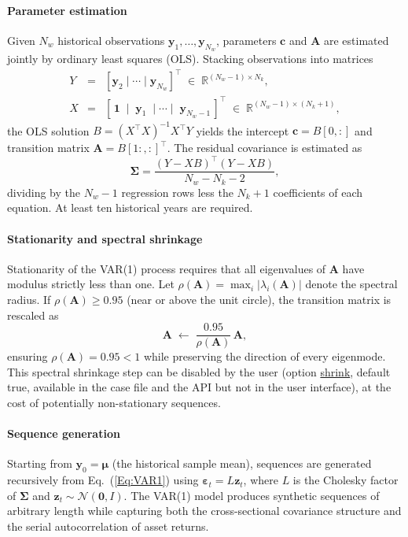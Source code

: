 \documentclass[fleqn,12pt]{report}
\newcommand{\code}[1]{\url{#1}}
\begin{document}
\paragraph*{Parameter estimation}
Given $N_w$ historical observations
$\bm{y}_1, \ldots, \bm{y}_{N_w}$,
parameters $\mathbf{c}$ and $\mathbf{A}$ are estimated jointly by ordinary
least squares (OLS).
Stacking observations into matrices
\begin{eqnarray}
    Y &=& [\bm{y}_2 \mid \cdots \mid \bm{y}_{N_w}]^\top
          \;\in\; \mathbb{R}^{(N_w-1)\times N_k}, \\
    X &=& [\,\mathbf{1} \;\mid\; \bm{y}_1 \;\mid \cdots \mid\; \bm{y}_{N_w-1}\,]^\top
          \;\in\; \mathbb{R}^{(N_w-1)\times (N_k+1)},
\end{eqnarray}
the OLS solution $B = (X^\top X)^{-1} X^\top Y$ yields the intercept
$\mathbf{c} = B[0,:]$ and transition matrix $\mathbf{A} = B[1:,:]^\top$.
The residual covariance is estimated as
\begin{equation}
    \bm{\Sigma} = \frac{(Y - XB)^\top(Y - XB)}{N_w - N_k - 2},
\end{equation}
dividing by the $N_w - 1$ regression rows less the $N_k + 1$ coefficients of each equation.
At least ten historical years are required.

\paragraph*{Stationarity and spectral shrinkage}
Stationarity of the VAR(1) process requires that all eigenvalues of
$\mathbf{A}$ have modulus strictly less than one.
Let $\rho(\mathbf{A}) = \max_i |\lambda_i(\mathbf{A})|$ denote the spectral
radius.
If $\rho(\mathbf{A}) \ge 0.95$ (near or above the unit circle), the
transition matrix is rescaled as
\begin{equation}
    \mathbf{A} \;\leftarrow\; \frac{0.95}{\rho(\mathbf{A})}\,\mathbf{A},
\end{equation}
ensuring $\rho(\mathbf{A}) = 0.95 < 1$ while preserving the direction of
every eigenmode.
This spectral shrinkage step can be disabled by the user (option \code{shrink}, default
true, available in the case file and the API but not in the user interface), at the cost
of potentially non-stationary sequences.

\paragraph*{Sequence generation}
Starting from $\bm{y}_0 = \bm{\mu}$ (the historical sample mean),
sequences are generated recursively from Eq.~(\ref{Eq:VAR1}) using
$\bm{\varepsilon}_t = L\bm{z}_t$, where $L$ is the Cholesky factor of
$\bm{\Sigma}$ and $\bm{z}_t \sim \mathcal{N}(\mathbf{0}, I)$.
The VAR(1) model produces synthetic sequences of arbitrary length while
capturing both the cross-sectional covariance structure and the
serial autocorrelation of asset returns.
\end{document}
